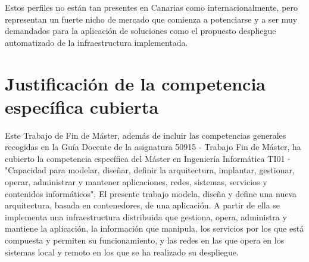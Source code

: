 Estos perfiles no están tan presentes en Canarias como internacionalmente, pero representan un fuerte nicho de mercado que comienza a potenciarse y a ser muy demandados para la aplicación de soluciones como el propuesto despliegue automatizado de la infraestructura implementada.

\section{Justificación de la competencia específica cubierta}

Este Trabajo de Fin de Máster, además de incluir las competencias generales recogidas en la Guía Docente de la asignatura 50915 - Trabajo Fin de Máster, ha cubierto la competencia específica del Máster en Ingeniería Informática TI01 - "Capacidad para modelar, diseñar, definir la arquitectura, implantar, gestionar, operar, administrar y mantener aplicaciones, redes, sistemas, servicios y contenidos informáticos". El presente trabajo modela, diseña y define una nueva arquitectura, basada en contenedores, de una aplicación. A partir de ella se implementa una infraestructura distribuida que gestiona, opera, administra y mantiene la aplicación, la información que manipula, los servicios por los que está compuesta y permiten su funcionamiento, y las redes en las que opera en los sistemas local y remoto en los que se ha realizado su despliegue.


